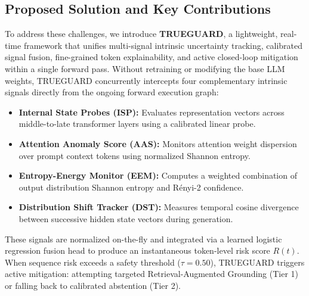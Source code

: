 \documentclass[journal]{IEEEtran}
\begin{document}
\subsection{Proposed Solution and Key Contributions}
To address these challenges, we introduce \textbf{TRUEGUARD}, a lightweight, real-time framework that unifies multi-signal intrinsic uncertainty tracking, calibrated signal fusion, fine-grained token explainability, and active closed-loop mitigation within a single forward pass. Without retraining or modifying the base LLM weights, TRUEGUARD concurrently intercepts four complementary intrinsic signals directly from the ongoing forward execution graph:
\begin{itemize}
    \item \textbf{Internal State Probes (ISP):} Evaluates representation vectors across middle-to-late transformer layers using a calibrated linear probe.
    \item \textbf{Attention Anomaly Score (AAS):} Monitors attention weight dispersion over prompt context tokens using normalized Shannon entropy.
    \item \textbf{Entropy-Energy Monitor (EEM):} Computes a weighted combination of output distribution Shannon entropy and R\'enyi-2 confidence.
    \item \textbf{Distribution Shift Tracker (DST):} Measures temporal cosine divergence between successive hidden state vectors during generation.
\end{itemize}

These signals are normalized on-the-fly and integrated via a learned logistic regression fusion head to produce an instantaneous token-level risk score $R(t)$. When sequence risk exceeds a safety threshold ($\tau = 0.50$), TRUEGUARD triggers active mitigation: attempting targeted Retrieval-Augmented Grounding (Tier 1) or falling back to calibrated abstention (Tier 2).
\end{document}
